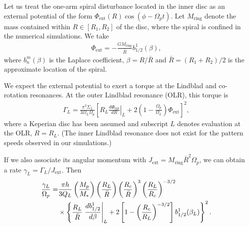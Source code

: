 Let us treat the one-arm spiral disturbance located in the inner disc as an  
external potential of the form $\Phi_\mathrm{ext}(R)\cos{\left(\phi -
    \Omega_pt\right)}$. Let $M_\mathrm{ring}$ denote the
mass contained within $R\in[R_1,R_2]$ of the disc, where the spiral is
confined in the numerical simulations. We take 
\begin{align} 
  \Phi_\mathrm{ext}
  =-\frac{GM_\mathrm{ring}}{\bar{R}}b^{1}_{1/2}(\beta),   
\end{align}
where $b_{n}^m(\beta)$ is the Laplace coefficient, $\beta = R/\bar{R}$ 
\citep{goldreich79} and $\bar{R} = (R_1+R_2)/2$ is the
approximate location of the spiral. 



We expect the external potential to exert a torque at the Lindblad  
and co-rotation resonances. At the outer Lindblad resonance (OLR), this
torque is 
\begin{align}
  \Gamma_L =
  \frac{\pi^2\Sigma_L}{3\Omega_L\Omega_p}
\left[\left.R_L\frac{d\Phi_\mathrm{ext}}{dR}\right|_L + 2\left(1 - \frac{\Omega_p}{\Omega_L}\right)\Phi_\mathrm{ext}\right]^2,
\end{align}   
where a Keperian disc has been assumed and subscript $L$ denotes
evaluation at the OLR, $R=R_L$. (The inner Lindblad resonance does not
exist for the pattern speeds observed in our simulations.) 

If we also associate its angular momentum with 
$J_\mathrm{ext}  = M_\mathrm{ring}\bar{R}^2\Omega_p$, we can obtain a
rate $\gamma_L=\Gamma_L/J_\mathrm{ext}$. Then 
\begin{align}
  \frac{\gamma_L}{\Omega_p} = &\frac{\pi
    h}{3Q_L}\left(\frac{M_p}{M_*}\right)\left(\frac{R_L}{\bar{R}}\right)\left(\frac{R_c}{\bar{R}}\right)^3\left(\frac{R_L}{R_c}\right)^{-3/2}\notag\\
  &\times \left\{\frac{R_L}{\bar{R}}\left.\frac{db_{1/2}^1}{d\beta}\right|_L + 2\left[1 -
      \left(\frac{R_c}{R_L}\right)^{-3/2}\right]b_{1/2}^1(\beta_L)\right\}^2.
\end{align}

